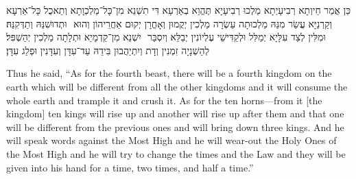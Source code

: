 \begin{aramaictranslation}
    ‏כֵּן אֲמַר חֵיוְתָא רְבִיעָיְתָא מַלְכוּ רְבִיעָיָא תֶּהֱוֵא בְאַרְעָא דִּי תִשְׁנֵא מִן־כָּל־מַלְכְוָתָא וְתֵאכֻל כָּל־אַרְעָא וּתְדוּשִׁנַּהּ וְתַדְּקִנַּהּ׃ ‎
    ‏ וְקַרְנַיָּא עֲשַׂר מִנַּהּ מַלְכוּתָה עַשְׂרָה מַלְכִין יְקֻמוּן וְאָחֳרָן יְקוּם אַחֲרֵיהוֹן וְהוּא יִשְׁנֵא מִן־קַדְמָיֵא וּתְלָתָה מַלְכִין יְהַשְׁפִּל׃ ‎
    ‏ וּמִלִּין לְצַד עִלָּיָא יְמַלִּל וּלְקַדִּישֵׁי עֶלְיוֹנִין יְבַלֵּא וְיִסְבַּר לְהַשְׁנָיָה זִמְנִין וְדָת וְיִתְיַהֲבוּן בִּידֵהּ עַד־עִדָּן וְעִדָּנִין וּפְלַג עִדָּן׃
\end{aramaictranslation}

\begin{translation}
    Thus he said, ``As for the fourth beast, there will be a fourth kingdom on the earth which will be different from all the other kingdoms and it will consume the whole earth and trample it and crush it.
    As for the ten horns---from it [the kingdom] ten kings will rise up and another will rise up after them and that one will be different from the previous ones and will bring down three kings.
    And he will speak words against the Most High and he will wear-out the Holy Ones of the Most High and he will try to change the times and the Law and they will be given into his hand for a time, two times, and half a time.''
\end{translation}


